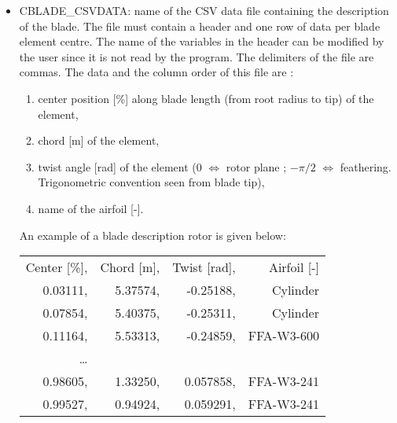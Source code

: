 \begin{itemize}
\item CBLADE\_CSVDATA: name of the CSV data file containing the description of the blade. The file must contain a header and one row of data per blade element centre. The name of the variables in the header can be modified by the user since it is not read by the program. The delimiters of the file are commas. The data and the column order of this file are : 
\begin{enumerate}
\item center position [\%] along blade length (from root radius to tip) of the element,
\item chord [m] of the element,
\item twist angle [rad] of the element ($0$ $\Leftrightarrow$ rotor plane ; $-\pi/2$ $\Leftrightarrow$ feathering. Trigonometric convention seen from blade tip),
\item name of the airfoil [-].
\end{enumerate}
An example of a blade description rotor is given below:
\begin{center}
\begin{tabular} {|rrrr|}
\hline
Center [\%],& Chord [m],& Twist [rad],& Airfoil [-] \\
0.03111,& 5.37574,& -0.25188,& Cylinder   \\
0.07854,& 5.40375,& -0.25311,& Cylinder   \\
0.11164,& 5.53313,& -0.24859,& FFA-W3-600 \\
\ldots  &         &          &            \\
0.98605,& 1.33250,& 0.057858,& FFA-W3-241 \\
0.99527,& 0.94924,& 0.059291,& FFA-W3-241 \\
\hline
\end{tabular}
\end{center}


\end{itemize}
